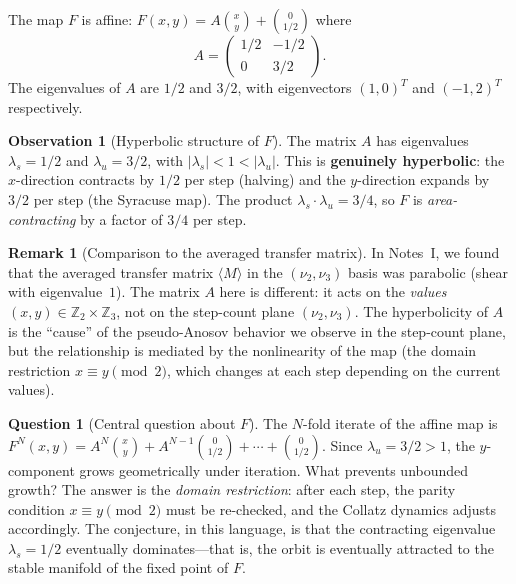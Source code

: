 \documentclass[11pt,a4paper]{article}
\newcommand{\Z}{\mathbb{Z}}
\theoremstyle{plain}
\theoremstyle{definition}
\newtheorem{remark}[theorem]{Remark}
\newtheorem{observation}[theorem]{Observation}
\newtheorem{question}[theorem]{Question}
\begin{document}
The map $F$ is affine: $F(x,y) = A \binom{x}{y} + \binom{0}{1/2}$ where
\begin{equation}\label{eq:F-matrix}
    A = \begin{pmatrix} 1/2 & -1/2 \\ 0 & 3/2 \end{pmatrix}.
\end{equation}
The eigenvalues of $A$ are $1/2$ and $3/2$, with eigenvectors $(1, 0)^T$ and $(-1, 2)^T$ respectively.

\begin{observation}[Hyperbolic structure of $F$]\label{obs:F-hyperbolic}
    The matrix $A$ has eigenvalues $\lambda_s = 1/2$ and $\lambda_u = 3/2$, with $|\lambda_s| < 1 < |\lambda_u|$. This is \textbf{genuinely hyperbolic}: the $x$-direction contracts by $1/2$ per step (halving) and the $y$-direction expands by $3/2$ per step (the Syracuse map). The product $\lambda_s \cdot \lambda_u = 3/4$, so $F$ is \emph{area-contracting} by a factor of $3/4$ per step.
\end{observation}

\begin{remark}[Comparison to the averaged transfer matrix]
    In Notes~I, we found that the averaged transfer matrix $\langle M \rangle$ in the $(\nu_2, \nu_3)$ basis was parabolic (shear with eigenvalue~$1$). The matrix $A$ here is different: it acts on the \emph{values} $(x, y) \in \Z_2 \times \Z_3$, not on the step-count plane $(\nu_2, \nu_3)$. The hyperbolicity of $A$ is the ``cause'' of the pseudo-Anosov behavior we observe in the step-count plane, but the relationship is mediated by the nonlinearity of the map (the domain restriction $x \equiv y \pmod{2}$, which changes at each step depending on the current values).
\end{remark}

\begin{question}[Central question about $F$]\label{q:F-iterate}
    The $N$-fold iterate of the affine map is $F^N(x,y) = A^N \binom{x}{y} + A^{N-1}\binom{0}{1/2} + \cdots + \binom{0}{1/2}$. Since $\lambda_u = 3/2 > 1$, the $y$-component grows geometrically under iteration. What prevents unbounded growth? The answer is the \emph{domain restriction}: after each step, the parity condition $x \equiv y \pmod{2}$ must be re-checked, and the Collatz dynamics adjusts accordingly. The conjecture, in this language, is that the contracting eigenvalue $\lambda_s = 1/2$ eventually dominates---that is, the orbit is eventually attracted to the stable manifold of the fixed point of $F$.
\end{question}
\end{document}
